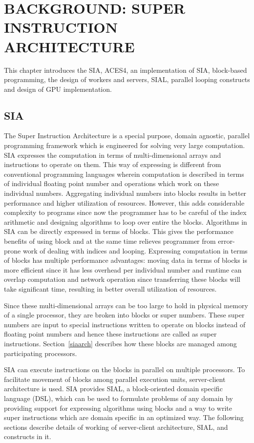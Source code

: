 \chapter{BACKGROUND: SUPER INSTRUCTION ARCHITECTURE} \label{background}

This chapter introduces the SIA, ACES4, an implementation of SIA, block-based
programming, the design of workers and servers, SIAL, parallel looping constructs
and design of GPU implementation.

\section{SIA}
The Super Instruction Architecture is a special purpose, domain agnostic,
parallel programming framework which is engineered for solving very large
computation. SIA expresses the computation in terms of multi-dimensional arrays and
instructions to operate on them. This way of expressing is different from conventional programming
languages wherein computation is described in terms of individual floating point
number and operations which work on these individual numbers. Aggregating
individual numbers into blocks results in better performance and higher utilization
of resources. However, this adds considerable complexity to programs since now
the programmer has to be careful of the index arithmetic and designing algorithms to loop
over entire the blocks. Algorithms in SIA can be directly expressed in terms of
blocks. This gives the performance benefits of using block and at the same time relieves
programmer from error-prone work of dealing with indices and looping. Expressing
computation in terms of blocks has multiple performance advantages: moving data in terms
of blocks is more efficient since it has less overhead per individual number
and runtime can overlap computation and network operation since transferring these
blocks will take significant time, resulting in better overall utilization of resources.

Since these multi-dimensional arrays can be too
large to hold in physical memory of a single processor, they are broken into
blocks or super numbers. These super numbers are input to special instructions
written to operate on blocks instead of floating point numbers and hence these
instructions are called as super instructions. Section~\ref{siaarch} describes how
these blocks are managed among participating processors.

SIA can execute instructions on the blocks in parallel on multiple processors. To
facilitate movement of blocks among parallel execution units, server-client
architecture is used. SIA provides SIAL, a block-oriented domain specific
language (DSL), which can be used to formulate problems of any domain by providing
support for expressing algorithms using blocks and a way
to write super instructions which are domain specific in an optimized way. The
following sections describe details of working of server-client architecture,
SIAL, and constructs in it.

